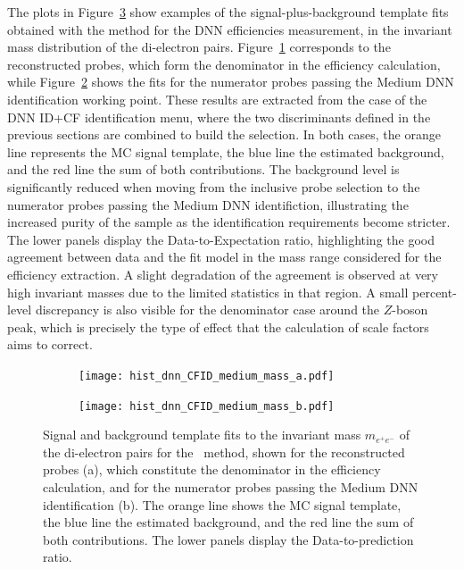 The plots in Figure~\ref{fig:zmass_fit_dnn_medium} show examples of the signal-plus-background template fits obtained with the \zmass method for the DNN efficiencies measurement, in the invariant mass distribution of the di-electron pairs. Figure~\ref{fig:zmass_fit_dnn_medium_a} corresponds to the reconstructed probes, which form the denominator in the efficiency calculation, while Figure~\ref{fig:zmass_fit_dnn_medium_b} shows the fits for the numerator probes passing the Medium DNN identification working point. These results are extracted from the case of the DNN ID+CF identification menu, where the two discriminants defined in the previous sections are combined to build the selection. 
In both cases, the orange line represents the MC signal template, the blue line the estimated background, and the red line the sum of both contributions. The background level is significantly reduced when moving from the inclusive probe selection to the numerator probes passing the Medium DNN identifiction, illustrating the increased purity of the sample as the identification requirements become stricter. 
The lower panels display the Data-to-Expectation ratio, highlighting the good agreement between data and the fit model in the mass range considered for the efficiency extraction. A slight degradation of the agreement is observed at very high invariant masses due to the limited statistics in that region. A small percent-level discrepancy is also visible for the denominator case around the $Z$-boson peak, which is precisely the type of effect that the calculation of scale factors aims to correct.

\begin{figure}[htbp]
  \centering
  \begin{subfigure}[b]{0.49\linewidth}
    \texttt{[image: hist\_dnn\_CFID\_medium\_mass\_a.pdf]}
    \caption{}
    \label{fig:zmass_fit_dnn_medium_a}
  \end{subfigure}
  \begin{subfigure}[b]{0.49\linewidth}
    \texttt{[image: hist\_dnn\_CFID\_medium\_mass\_b.pdf]}
    \caption{}
    \label{fig:zmass_fit_dnn_medium_b}
  \end{subfigure}
  \caption{
    Signal and background template fits to the invariant mass $m_{e^{+}e^{-}}$ of the di-electron pairs for the \zmass\ method, shown for the reconstructed probes (a), which constitute the denominator in the efficiency calculation, and for the numerator probes passing the Medium DNN identification (b). The orange line shows the MC signal template, the blue line the estimated background, and the red line the sum of both contributions. The lower panels display the Data-to-prediction ratio.}
  \label{fig:zmass_fit_dnn_medium}
\end{figure}

